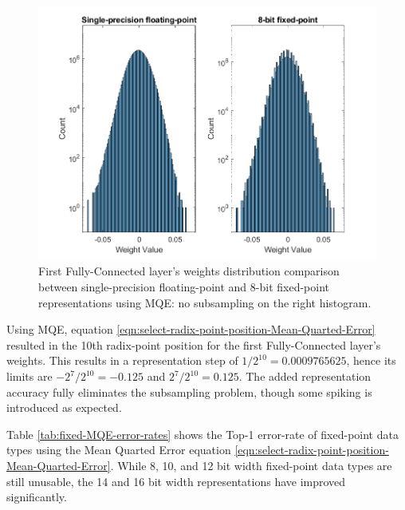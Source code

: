 \begin{figure} [H]
	\centering
	\includegraphics[scale=0.9]{../Images/Weights-distributions/original-vs-fixed8/weight-distribution-FC1-MQE.png}
	\decoRule
	\caption[First Fully-Connected layer's weights distribution comparison between single-precision floating-point and 8-bit fixed-point representations using MQE]{First Fully-Connected layer's weights distribution comparison between single-precision floating-point and 8-bit fixed-point representations using MQE: no subsampling on the right histogram.}
	\label{fig:weight-distribution-comparison-FC1-MQE}
\end{figure}

Using MQE, equation \ref{eqn:select-radix-point-position-Mean-Quarted-Error} resulted in the 10th radix-point position for the first Fully-Connected layer's weights. This results in a representation step of $1/2^10 = 0.0009765625$, hence its limits are $-2^7/2^10 = -0.125$ and $2^7/2^10 = 0.125$. The added representation accuracy fully eliminates the subsampling problem, though some spiking is introduced as expected.

Table \ref{tab:fixed-MQE-error-rates} shows the Top-1 error-rate of fixed-point data types using the Mean Quarted Error equation \ref{eqn:select-radix-point-position-Mean-Quarted-Error}. While 8, 10, and 12 bit width fixed-point data types are still unusable, the 14 and 16 bit width representations have improved significantly.

